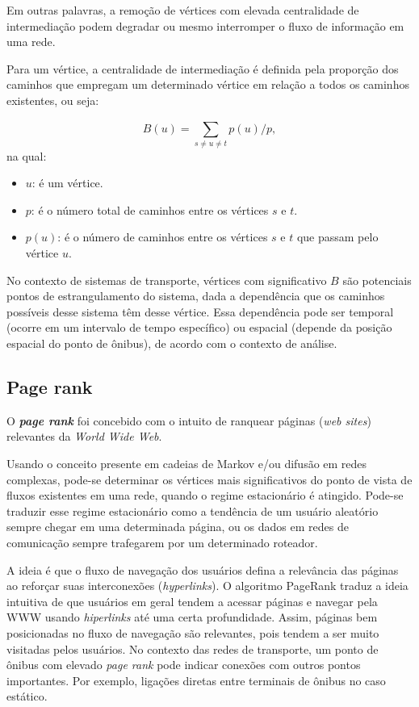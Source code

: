 Em outras palavras, a remoção de vértices com elevada centralidade de intermediação podem degradar ou mesmo interromper o fluxo de informação em uma rede. 

Para um vértice, a centralidade de intermediação é definida pela proporção dos caminhos que empregam um determinado vértice em relação a todos os caminhos existentes, ou seja:

 \begin{equation}
     B(u) = \sum_{s \neq u \neq t }^{} p(u) / p,
 \end{equation} 
na qual:

 \begin{itemize}
 \item $u$: é um vértice.
 \item $p$: é o número total de caminhos entre os vértices $s$ e $t$.
 \item $p(u)$: é o número de caminhos entre os vértices $s$ e $t$ que passam pelo vértice $u$.
\end{itemize}  

No contexto de sistemas de transporte, vértices com significativo $B$ são potenciais pontos de estrangulamento do sistema, dada a dependência que os caminhos possíveis desse sistema têm desse vértice. Essa dependência pode ser temporal (ocorre em um intervalo de tempo específico) ou espacial (depende da posição espacial do ponto de ônibus), de acordo com o contexto de análise.

\subsection{Page rank}


O {\bf \emph{page rank}} foi concebido com o intuito de ranquear páginas (\emph{web sites}) relevantes da \emph{World Wide Web}. 

Usando o conceito presente em cadeias de Markov e/ou difusão em redes complexas, pode-se determinar os vértices mais significativos do ponto de vista de fluxos existentes em uma rede, quando o regime estacionário é atingido. Pode-se traduzir esse regime estacionário como a tendência de um usuário aleatório sempre chegar em uma determinada página, ou os dados em redes de comunicação sempre trafegarem por um determinado roteador.

A ideia é que o fluxo de navegação dos usuários defina a relevância das páginas ao reforçar suas interconexões (\emph{hyperlinks}). O algoritmo PageRank \cite{brin:98} traduz a ideia intuitiva de que usuários em geral tendem a acessar páginas e navegar pela WWW usando \emph{hiperlinks} até uma certa profundidade. Assim, páginas bem posicionadas no fluxo de navegação são relevantes, pois tendem a ser muito visitadas pelos usuários. 
No contexto das redes de transporte, um ponto de ônibus com elevado \emph{page rank} pode indicar conexões com outros pontos importantes. Por exemplo, ligações diretas entre terminais de ônibus no caso estático.


